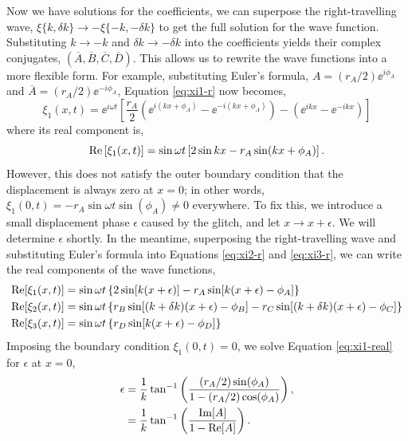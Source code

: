 Now we have solutions for the coefficients, we can superpose the right-travelling wave, \(\xi\{k, \delta k\} \rightarrow - \xi\{-k, -\delta k\}\) to get the full solution for the wave function. Substituting \(k \rightarrow -k\) and \(\delta k \rightarrow -\delta k\) into the coefficients yields their complex conjugates, \((\overline{A},\overline{B},\overline{C},\overline{D})\). This allows us to rewrite the wave functions into a more flexible form. For example, substituting Euler's formula, \(A = (r_A/2) \ee^{i\phi_A}\) and \(\overline{A} = (r_A/2) \ee^{-i\phi_A}\), Equation \ref{eq:xi1-r} now becomes,
%
\begin{equation}
    \xi_1(x, t) = \ee^{i \omega t} \left[ \frac{r_A}{2} \left( \ee^{i(kx + \phi_A)} - \ee^{-i(kx + \phi_A)} \right) - \left( \ee^{ikx} - \ee^{-ikx} \right) \right] \label{eq:xi1}
\end{equation}
%
where its real component is,
\begin{equation}
    {\mathrm{Re}}\left[\xi_1(x, t)\right] = \sin \omega t \left[2 \sin kx - r_A \sin(kx + \phi_A)\right].
\end{equation}
%
However, this does not satisfy the outer boundary condition that the displacement is always zero at \(x=0\); in other words, \(\xi_1(0, t) = - r_A \sin \omega t \sin(\phi_A) \neq 0\) everywhere. To fix this, we introduce a small displacement phase \(\epsilon\) caused by the glitch, and let \(x \rightarrow x + \epsilon\). We will determine \(\epsilon\) shortly. In the meantime, superposing the right-travelling wave and substituting Euler's formula into Equations \ref{eq:xi2-r} and \ref{eq:xi3-r}, we can write the real components of the wave functions,
%
\begin{align}
    {\mathrm{Re}}[\xi_1(x, t)] &= \sin \omega t \left\{2 \sin[k (x + \epsilon)] - r_A \sin[k(x + \epsilon) - \phi_A]\right\} \label{eq:xi1-real} \\
    {\mathrm{Re}}[\xi_2(x, t)] &= \sin \omega t \left\{ r_B \sin[(k + \delta k)(x + \epsilon) - \phi_B] - r_C \sin[(k + \delta k)(x + \epsilon) - \phi_C]\right\} \\
    {\mathrm{Re}}[\xi_3(x, t)] &= \sin \omega t \left\{r_D \sin[k(x + \epsilon) - \phi_D]\right\} \label{eq:xi3-real}
\end{align}
%
Imposing the boundary condition \(\xi_1(0, t) = 0\), we solve Equation \ref{eq:xi1-real} for \(\epsilon\) at \(x=0\),
%
\begin{align}
    \epsilon &= \frac{1}{k} \tan^{-1}\left( \frac{(r_A / 2) \sin(\phi_A)}{1 - (r_A/2) \cos(\phi_A)} \right), \notag\\
    &= \frac{1}{k} \tan^{-1}\left( \frac{{\mathrm{Im}}[A]}{1 - {\mathrm{Re}}[A]} \right). \label{eq:1d-phase}
\end{align}
%

